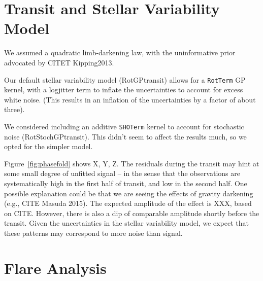 \documentclass[12pt,modern,tighten]{aastex63}
\begin{document}
\section{Transit and Stellar Variability Model}
\label{app:gptransit}

We assumed a quadratic limb-darkening law, with the uninformative prior
advocated by CITET Kipping2013.


Our default stellar variability model (RotGPtransit) allows for a
\texttt{RotTerm} GP kernel, with a logjitter term to inflate the
uncertainties to account for excess white noise.
(This results in an inflation of the uncertainties by a factor
of about three).

We considered including an additive \texttt{SHOTerm} kernel to account
for stochastic noise (RotStochGPtransit).  This didn't seem to affect the results much, so
we opted for the simpler model.



Figure~\ref{fig:phasefold} shows X, Y, Z.  The residuals during the
transit may hint at some small degree of unfitted signal -- in the
sense that the observations are systematically high in the first half
of transit, and low in the second half.  
One possible explanation could be that we are seeing the effects of
gravity darkening (e.g., CITE Masuda 2015).
The expected amplitude of the effect is XXX, based on CITE.
However, there is also a dip of comparable amplitude shortly before
the transit. 
Given the uncertainties in the stellar variability model, we expect
that these patterns may correspond to more noise than signal.

\section{Flare Analysis}
\label{app:flare}
\end{document}
